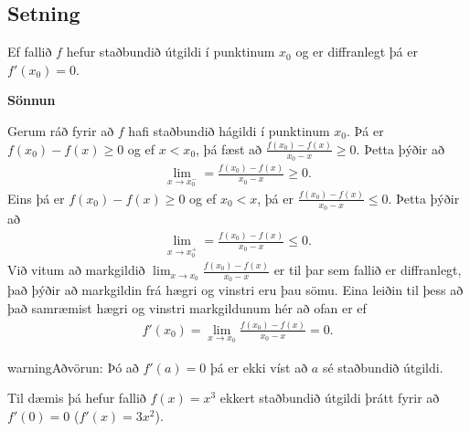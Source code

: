 \documentclass[a4paper,10pt,icelandic]{sphinxmanual}
\begin{document}
\subsection{Setning}
\label{kafli03:setning-3-5-2}\label{kafli03:id11}
Ef fallið \(f\) hefur staðbundið útgildi í punktinum \(x_0\) og
er diffranlegt þá er \(f'(x_0)=0\).

\begin{DUlineblock}{0em}
\item[] 
\end{DUlineblock}

\textbf{Sönnun}

Gerum ráð fyrir að \(f\) hafi staðbundið hágildi í punktinum \(x_0\).
Þá er \(f(x_0)-f(x)\geq 0\) og ef \(x<x_0\),
þá fæst að  \(\frac{f(x_0)-f(x)}{x_0-x}\geq 0\). Þetta þýðir að
\begin{equation*}
\begin{split}\lim_{x \to x_0^-} = \frac{f(x_0) - f(x)}{x_0-x} \geq 0.
    \label{vinstri}\end{split}
\end{equation*}
Eins þá er \(f(x_0)-f(x)\geq 0\) og ef \(x_0<x\),
þá er \(\frac{f(x_0)-f(x)}{x_0-x} \leq 0\).
Þetta þýðir að
\begin{equation*}
\begin{split}\lim_{x \to x_0^+} = \frac{f(x_0) - f(x)}{x_0-x} \leq 0.
    \label{haegri}\end{split}
\end{equation*}
Við vitum að markgildið
\(\lim_{x\to x_0} \frac{f(x_0)-f(x)}{x_0-x}\) er til þar sem fallið
er diffranlegt, það þýðir að markgildin frá hægri og vinstri eru þau
sömu. Eina leiðin til þess að það samræmist hægri og vinstri markgildunum
hér að ofan er ef
\begin{equation*}
\begin{split}f'(x_0) = \lim_{x\to x_0} \frac{f(x_0)-f(x)}{x_0-x} = 0.\end{split}
\end{equation*}
\begin{DUlineblock}{0em}
\item[] 
\item[] 
\end{DUlineblock}

\begin{notice}{warning}{Aðvörun:}
Þó að \(f'(a)=0\) þá er ekki víst að \(a\) sé staðbundið útgildi.

Til dæmis þá hefur fallið \(f(x) = x^3\) ekkert staðbundið útgildi
þrátt fyrir að \(f'(0) = 0\) (\(f'(x) = 3x^2\)).
\end{notice}
\end{document}
